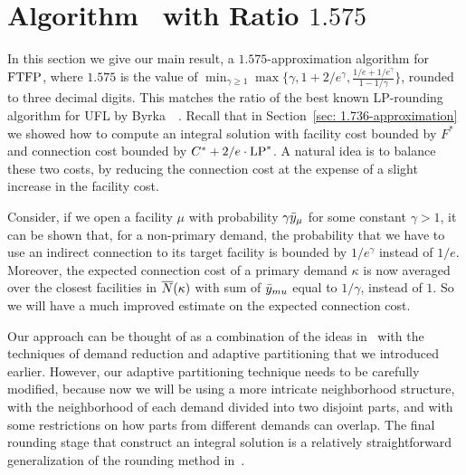 

\section{Algorithm~{\EBGS} with Ratio $1.575$}\label{sec: 1.575-approximation}

In this section we give our main result, a $1.575$-approximation
algorithm for $\mbox{\rm FTFP}$, where $1.575$ is the value of $\min_{\gamma\geq
  1}\max\{\gamma, 1+2/e^\gamma, \frac{1/e+1/e^\gamma}{1-1/\gamma}\}$,
rounded to three decimal digits. This matches the ratio of the best
known LP-rounding algorithm for UFL by
Byrka~{\etal}~\cite{ByrkaGS10}. Recall that in Section~\ref{sec:
  1.736-approximation} we showed how to compute an integral solution
with facility cost bounded by $F^\ast$ and connection cost bounded by
$C^\ast + 2/e\cdot\mbox{\rm LP}^\ast$. A natural idea is to balance these two
costs, by reducing the connection cost at the expense of a slight
increase in the facility cost.

Consider, if we open a facility $\mu$ with probability
$\gamma{\bar y}_{\mu}$ for some constant $\gamma > 1$, it can be shown
that, for a non-primary demand, the probability that we have to use an
indirect connection to its target facility is bounded by $1/e^\gamma$
instead of $1/e$. Moreover, the expected connection cost of a primary
demand $\kappa$ is now averaged over the closest facilities in
${\overline{N}}(\kappa)$ with sum of ${\bar y}_{mu}$ equal to $1/\gamma$, instead
of $1$. So we will have a much improved estimate on the expected
connection cost.

Our approach can be thought of as a combination of the ideas
in~\cite{ByrkaGS10} with the techniques of demand reduction and
adaptive partitioning that we introduced earlier. However, our
adaptive partitioning technique needs to be carefully modified,
because now we will be using a more intricate neighborhood structure,
with the neighborhood of each demand divided into two disjoint parts,
and with some restrictions on how parts from different demands can
overlap. The final rounding stage that construct an integral solution
is a relatively straightforward generalization of the rounding method
in~\cite{ByrkaGS10}.

